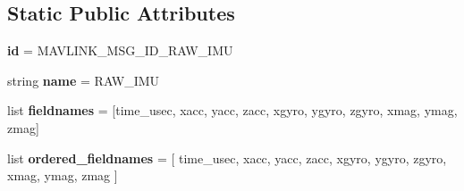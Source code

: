 \subsection*{Static Public Attributes}
\begin{DoxyCompactItemize}
\item 
\mbox{\label{classpymavlink_1_1dialects_1_1v10_1_1MAVLink__raw__imu__message_a8f1244465b0ca627d867c9a88d644b81}} 
{\bfseries id} = M\+A\+V\+L\+I\+N\+K\+\_\+\+M\+S\+G\+\_\+\+I\+D\+\_\+\+R\+A\+W\+\_\+\+I\+MU
\item 
\mbox{\label{classpymavlink_1_1dialects_1_1v10_1_1MAVLink__raw__imu__message_ae20aa0a2982b4e303795c9b6e7d9c607}} 
string {\bfseries name} = \textquotesingle{}R\+A\+W\+\_\+\+I\+MU\textquotesingle{}
\item 
\mbox{\label{classpymavlink_1_1dialects_1_1v10_1_1MAVLink__raw__imu__message_a83569c01166c8ba252053f604f13c779}} 
list {\bfseries fieldnames} = \mbox{[}\textquotesingle{}time\+\_\+usec\textquotesingle{}, \textquotesingle{}xacc\textquotesingle{}, \textquotesingle{}yacc\textquotesingle{}, \textquotesingle{}zacc\textquotesingle{}, \textquotesingle{}xgyro\textquotesingle{}, \textquotesingle{}ygyro\textquotesingle{}, \textquotesingle{}zgyro\textquotesingle{}, \textquotesingle{}xmag\textquotesingle{}, \textquotesingle{}ymag\textquotesingle{}, \textquotesingle{}zmag\textquotesingle{}\mbox{]}
\item 
\mbox{\label{classpymavlink_1_1dialects_1_1v10_1_1MAVLink__raw__imu__message_aaf62a3c01037e0839c8eb6add18b8ce5}} 
list {\bfseries ordered\+\_\+fieldnames} = \mbox{[} \textquotesingle{}time\+\_\+usec\textquotesingle{}, \textquotesingle{}xacc\textquotesingle{}, \textquotesingle{}yacc\textquotesingle{}, \textquotesingle{}zacc\textquotesingle{}, \textquotesingle{}xgyro\textquotesingle{}, \textquotesingle{}ygyro\textquotesingle{}, \textquotesingle{}zgyro\textquotesingle{}, \textquotesingle{}xmag\textquotesingle{}, \textquotesingle{}ymag\textquotesingle{}, \textquotesingle{}zmag\textquotesingle{} \mbox{]}
\item 
\mbox{\label{classpymavlink_1_1dialects_1_1v10_1_1MAVLink__raw__imu__message_ae25f37ee51a5c2b93785aabfee5abbf2}} 

\end{DoxyCompactItemize}
